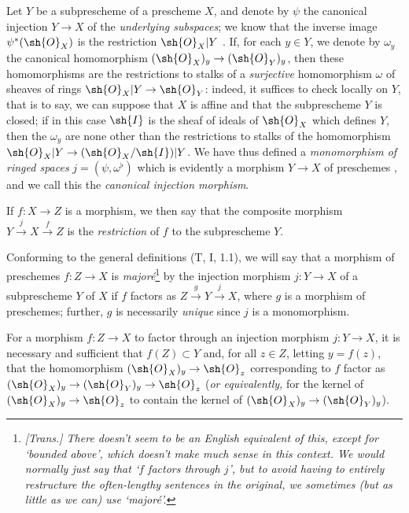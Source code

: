 \begin{env}[4.1.7]
\label{I.4.1.7}
Let $Y$ be a subprescheme of a prescheme $X$, and denote by $\psi$ the canonical injection $Y\to X$ of the \emph{underlying subspaces};
we know that the inverse image $\psi^*(\sh{O}_X)$ is the restriction $\sh{O}_X|Y$ .
If, for each $y\in Y$, we denote by $\omega_y$ the canonical homomorphism $(\sh{O}_X)_y\to(\sh{O}_Y)_y$, then these homomorphisms are the restrictions to stalks of a \emph{surjective} homomorphism $\omega$ of sheaves of rings $\sh{O}_X|Y\to\sh{O}_Y$: indeed, it suffices to check locally on $Y$, that is to say, we can suppose that $X$ is affine and that the subprescheme $Y$ is closed; if in this case $\sh{I}$ is the sheaf of ideals of $\sh{O}_X$ which defines $Y$, then the $\omega_y$ are none other than the restrictions to stalks of the homomorphism $\sh{O}_X|Y\to(\sh{O}_X/\sh{I})|Y$.
We have thus defined a \emph{monomorphism of ringed spaces}  $j=(\psi,\omega^\flat)$ which is evidently a morphism $Y\to X$ of preschemes , and we call this the \emph{canonical injection morphism}.

If $f:X\to Z$ is a morphism, we then say that the composite morphism $Y\xrightarrow{j}X\xrightarrow{f}Z$ is the \emph{restriction} of $f$ to the subprescheme $Y$.
\end{env}

\begin{env}[4.1.8]
\label{I.4.1.8}
Conforming to the general definitions (T, I, 1.1), we will say that a morphism of preschemes $f:Z\to X$ is \emph{major\'e}\footnote{\emph{[Trans.] There doesn't seem to be an English equivalent of this, except for `bounded above', which doesn't make much sense in this context. We would normally just say that `$f$ factors through $j$', but to avoid having to entirely restructure the often-lengthy sentences in the original, we sometimes (but as little as we can) use `major\'e'.}} by the injection morphism $j:Y\to X$ of a subprescheme $Y$ of $X$ if $f$ factors as $Z\xrightarrow{g}Y\xrightarrow{j}X$, where $g$ is a morphism of preschemes;
further, $g$ is necessarily \emph{unique} since $j$ is a monomorphism.
\end{env}

\begin{proposition}[4.1.9]
\label{I.4.1.9}
For a morphism $f:Z\to X$ to factor through an injection morphism $j:Y\to X$, it is necessary and sufficient that $f(Z)\subset Y$ and, for all $z\in Z$, letting $y=f(z)$, that the homomorphism $(\sh{O}_X)_y\to\sh{O}_z$ corresponding to $f$ factor as $(\sh{O}_X)_y\to(\sh{O}_Y)_y\to\sh{O}_z$ (\emph{or equivalently,} for the kernel of $(\sh{O}_X)_y\to\sh{O}_z$ to contain the kernel of $(\sh{O}_X)_y\to(\sh{O}_Y)_y$).
\end{proposition}

